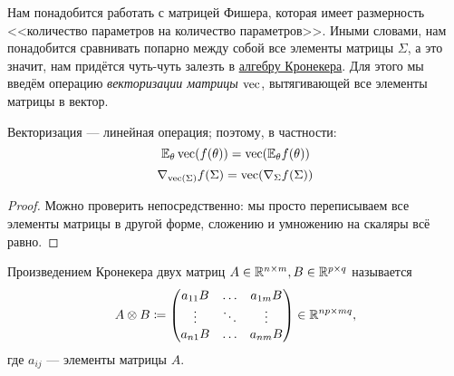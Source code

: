 Нам понадобится работать с матрицей Фишера, которая имеет размерность <<количество параметров на количество параметров>>. Иными словами, нам понадобится сравнивать попарно между собой все элементы матрицы $\Sigma$, а это значит, нам придётся чуть-чуть залезть в \href{https://ru.wikipedia.org/wiki/Произведение_Кронекера}{алгебру Кронекера}. Для этого мы введём операцию \emph{векторизации матрицы} $\operatorname{vec}$, вытягивающей все элементы матрицы в вектор. 

\begin{proposition}
Векторизация --- линейная операция; поэтому, в частности:
\begin{equation}\label{exp_in_vec}
    \mathbb{E}_\theta \operatorname{vec} (f(\theta)) = \operatorname{vec}(\mathbb{E}_\theta f(\theta))
\end{equation}
\begin{equation}\label{nab_in_vec}
    \nabla_{\operatorname{vec}(\Sigma)} f(\Sigma) = \operatorname{vec}(\nabla_\Sigma f(\Sigma))
\end{equation}
\begin{proof}
Можно проверить непосредственно: мы просто переписываем все элементы матрицы в другой форме, сложению и умножению на скаляры всё равно.
\end{proof}
\end{proposition}

\begin{definition}
Произведением Кронекера двух матриц $A \in \mathbb{R}^{n \times m}, B \in \mathbb{R}^{p \times q}$ называется
$$A \otimes B \coloneqq 
\begin{pmatrix}
a_{11}B & \dots & a_{1m}B \\
\vdots & \ddots & \vdots \\
a_{n1}B & \dots & a_{nm}B
\end{pmatrix}
\in \mathbb{R}^{np \times mq},$$
где $a_{ij}$ --- элементы матрицы $A$.
\end{definition}

